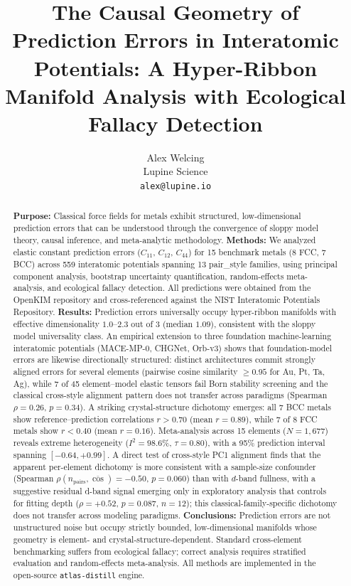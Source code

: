 \documentclass[twocolumn,9pt]{extarticle}
\begin{document}
\title{\bfseries The Causal Geometry of Prediction Errors in Interatomic Potentials: A Hyper-Ribbon Manifold Analysis with Ecological Fallacy Detection}
\author{Alex Welcing\\
\small Lupine Science\\
\small \texttt{alex@lupine.io}}
\date{}

\begin{abstract}
\noindent\textbf{Purpose:} Classical force fields for metals exhibit structured, low-dimensional prediction errors that can be understood through the convergence of sloppy model theory, causal inference, and meta-analytic methodology.
\textbf{Methods:} We analyzed elastic constant prediction errors ($C_{11}$, $C_{12}$, $C_{44}$) for 15 benchmark metals (8 FCC, 7 BCC) across 559 interatomic potentials spanning 13 pair\_style families, using principal component analysis, bootstrap uncertainty quantification, random-effects meta-analysis, and ecological fallacy detection. All predictions were obtained from the OpenKIM repository and cross-referenced against the NIST Interatomic Potentials Repository.
\textbf{Results:} Prediction errors universally occupy hyper-ribbon manifolds with effective dimensionality $1.0$--$2.3$ out of 3 (median $1.09$), consistent with the sloppy model universality class. An empirical extension to three foundation machine-learning interatomic potentials (MACE-MP-0, CHGNet, Orb-v3) shows that foundation-model errors are likewise directionally structured: distinct architectures commit strongly aligned errors for several elements (pairwise cosine similarity $\geq 0.95$ for Au, Pt, Ta, Ag), while 7 of 45 element--model elastic tensors fail Born stability screening and the classical cross-style alignment pattern does not transfer across paradigms (Spearman $\rho = 0.26$, $p = 0.34$). A striking crystal-structure dichotomy emerges: all 7 BCC metals show reference--prediction correlations $r>0.70$ (mean $r=0.89$), while 7 of 8 FCC metals show $r<0.40$ (mean $r=0.16$). Meta-analysis across 15 elements ($N=1{,}677$) reveals extreme heterogeneity ($I^2=98.6\%$, $\tau=0.80$), with a 95\% prediction interval spanning $[-0.64, +0.99]$. A direct test of cross-style PC1 alignment finds that the apparent per-element dichotomy is more consistent with a sample-size confounder (Spearman $\rho(n_{\text{pairs}}, \overline{\cos}) = -0.50$, $p = 0.060$) than with $d$-band fullness, with a suggestive residual d-band signal emerging only in exploratory analysis that controls for fitting depth ($\rho = +0.52$, $p = 0.087$, $n=12$); this classical-family-specific dichotomy does not transfer across modeling paradigms.
\textbf{Conclusions:} Prediction errors are not unstructured noise but occupy strictly bounded, low-dimensional manifolds whose geometry is element- and crystal-structure-dependent. Standard cross-element benchmarking suffers from ecological fallacy; correct analysis requires stratified evaluation and random-effects meta-analysis. All methods are implemented in the open-source \texttt{atlas-distill} engine.
\end{abstract}
\end{document}

